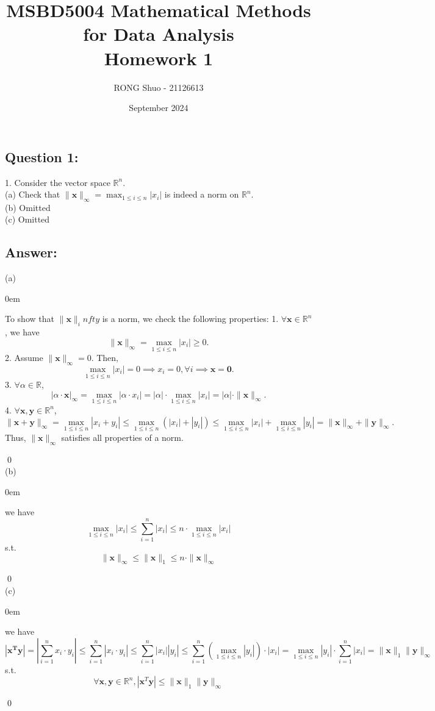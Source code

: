 \documentclass{article}
\title{\Large MSBD5004 Mathematical Methods for Data Analysis \\ \large Homework 1}
\author{RONG Shuo - 21126613}
\date{September 2024}
\newcommand{\R}{\mathbb{R}}
\renewenvironment{proof}{\begin{addmargin}[1em]{0em}\begin{newproof}}
{\end{newproof}\end{addmargin}\qed}
\begin{document}
\maketitle

\subsection*{Question 1:}
1. Consider the vector space \( \mathbb{R}^n \). \\
    (a) Check that $\|\bm{x} \|_\infty = \max_{1 \leq i \leq n}|x_i|$ is indeed a norm on \(\mathbb{R}^n\). \\
    (b) Omitted\\
    (c) Omitted\\

\subsection*{Answer:}
(a)
\begin{proof}
To show that \( \|\bm{x}\|_infty \) is a norm, we check the following properties:
1.
    \(\forall \bm{x} \in \mathbb{R}^n\), we have 
    \[
    \|\bm{x}\|_\infty = \max_{1 \leq i \leq n}|x_i| \geq 0.
    \] 
2.
    Assume  \( \|\bm{x}\|_\infty = 0 \). Then, 
    \[
    \max_{1 \leq i \leq n} |x_i| = 0 \implies x_i = 0, \forall i \implies \bm{x} = \bm{0}.
    \]
3.
    \(\forall \alpha \in \R\),
    \[ |\alpha \cdot \bm{x}|_\infty = \max_{1 \leq i \leq n}|\alpha \cdot x_i| = |\alpha| \cdot \max_{1 \leq i \leq n}|x_i| = |\alpha| \cdot \|\bm{x}\|_\infty.
    \] 
4.
    \(\forall \bm{x},\bm{y} \in \R^n\),
    \[
    \|\bm{x} + \bm{y}\|_\infty = \max_{1 \leq i \leq n}|x_i + y_i| \leq \max_{1 \leq i \leq n} (|x_i| + |y_i|) \leq \max_{1 \leq i \leq n} |x_i| + \max_{1 \leq i \leq n} |y_i| = \|\bm{x}\|_\infty + \|\bm{y}\|_\infty.
    \]
Thus, \( \|\bm{x}\|_\infty \) satisfies all properties of a norm.
\end{proof}
\\
(b)
\begin{proof}
    we have 
    \[ 
    \max_{1 \leq i \leq n}|x_i| \leq \sum_{i=1}^n|x_i| \leq n \cdot \max_{1 \leq i \leq n}|x_i|
    \]
    s.t. 
    \[
    \|\bm{x}\|_\infty \leq \|\bm{x}\|_1 \leq n \cdot \|\bm{x}\|_\infty
    \]
\end{proof}
\\
(c)
\begin{proof}
    we have
    \[
    |\bm{x^Ty}| = |\sum_{i=1}^nx_i \cdot y_i| \leq \sum_{i=1}^n|x_i \cdot y_i| \leq \sum_{i=1}^n|x_i||y_i| \leq \sum_{i=1}^n(\max_{1 \leq i \leq n}|y_i|)\cdot|x_i|=\max_{1\leq i\leq n}|y_i|\cdot\sum_{i=1}^n|x_i|=\|\bm{x}\|_1\|\bm{y}\|_\infty
    \]
    s.t.
    \[
    \forall \bm{x, y} \in \R^n, |\bm{x}^T\bm{y}| \leq \|\bm{x}\|_1\|\bm{y}\|_\infty
    \]
\end{proof}
\end{document}
